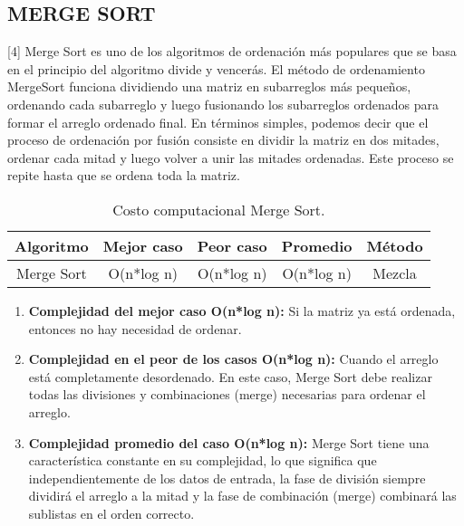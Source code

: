 \documentclass{article}
\begin{document}
\subsection{MERGE SORT}
[4] Merge Sort es uno de los algoritmos de ordenación más populares que se basa en el principio del algoritmo divide y vencerás. El método de ordenamiento MergeSort funciona dividiendo una matriz en subarreglos más pequeños, ordenando cada subarreglo y luego fusionando los subarreglos ordenados para formar el arreglo ordenado final. En términos simples, podemos decir que el proceso de ordenación por fusión consiste en dividir la matriz en dos mitades, ordenar cada mitad y luego volver a unir las mitades ordenadas. Este proceso se repite hasta que se ordena toda la matriz.

    \begin{table}[H]
        \centering
        \begin{tabular}{||c c c c c||} 
         \hline
         \textbf{Algoritmo} & \textbf{Mejor caso} & \textbf{Peor caso} & \textbf{Promedio} & \textbf{Método} \\ [0.5ex] 
         \hline\hline
         Merge Sort & O(n*log n) & O(n*log n) & O(n*log n) & Mezcla \\ [0.5ex] 
         \hline
        \end{tabular}
        \caption{Costo computacional Merge Sort.}
        \label{table:dataMergeSort}
    \end{table}
    
    \begin{enumerate}
            \item \textbf{Complejidad del mejor caso O(n*log n):} Si la matriz ya está ordenada, entonces no hay necesidad de ordenar.
            
            \item \textbf{Complejidad en el peor de los casos O(n*log n):} Cuando el arreglo está completamente desordenado. En este caso, Merge Sort debe realizar todas las divisiones y combinaciones (merge) necesarias para ordenar el arreglo.
            
            \item \textbf{Complejidad promedio del caso O(n*log n):} Merge Sort tiene una característica constante en su complejidad, lo que significa que independientemente de los datos de entrada, la fase de división siempre dividirá el arreglo a la mitad y la fase de combinación (merge) combinará las sublistas en el orden correcto.
    \end{enumerate}
\end{document}
